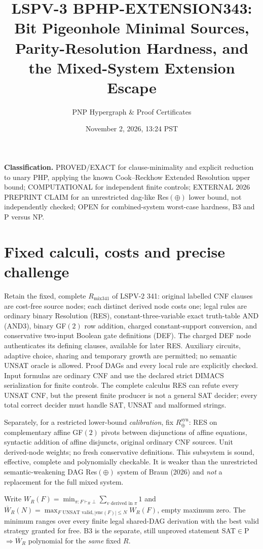 \documentclass[11pt]{article}
\title{LSPV-3 BPHP-EXTENSION343: Bit Pigeonhole Minimal Sources, Parity-Resolution Hardness, and the Mixed-System Extension Escape}
\author{PNP Hypergraph \& Proof Certificates}
\date{November 2, 2026, 13:24 PST}
\begin{document}
\maketitle
\noindent\textbf{Classification.} \textsc{PROVED/EXACT} for clause-minimality and explicit reduction to unary PHP, applying the known Cook--Reckhow Extended Resolution upper bound; \textsc{COMPUTATIONAL} for independent finite controls; \textsc{EXTERNAL 2026 PREPRINT CLAIM} for an unrestricted dag-like Res$(\oplus)$ lower bound, not independently checked; \textsc{OPEN} for combined-system worst-case hardness, B3 and P versus NP.

\section{Fixed calculi, costs and precise challenge}
Retain the fixed, complete $R_{\mathrm{mix341}}$ of LSPV-2 341: original labelled CNF clauses are cost-free source nodes; each distinct derived node costs one; legal rules are ordinary binary Resolution (RES), constant-three-variable exact truth-table AND (AND3), binary GF$(2)$ row addition, charged constant-support conversion, and conservative two-input Boolean gate definitions (DEF). The charged DEF node authenticates its defining clauses, available for later RES. Auxiliary circuits, adaptive choice, sharing and temporary growth are permitted; no semantic UNSAT oracle is allowed. Proof DAGs and every local rule are explicitly checked. Input formulas are ordinary CNF and use the declared strict DIMACS serialization for finite controls. The complete calculus RES can refute every UNSAT CNF, but the present finite producer is not a general SAT decider; every total correct decider must handle SAT, UNSAT and malformed strings.

Separately, for a restricted lower-bound \emph{calibration}, fix $R_{\oplus}^{\mathrm{syn}}$: RES on complementary affine GF$(2)$ pivots between disjunctions of affine equations, syntactic addition of affine disjuncts, original ordinary CNF sources. Unit derived-node weights; no fresh conservative definitions. This subsystem is sound, effective, complete and polynomially checkable. It is weaker than the unrestricted semantic-weakening DAG Res$(\oplus)$ system of Braun (2026) and \emph{not} a replacement for the full mixed system.

Write $W_R(F)=\min_{\pi:F\vdash_R\bot}\sum_{v\text{ derived in }\pi}1$ and $\overline W_R(N)=\max_{F\text{ UNSAT valid},|\mathrm{enc}(F)|\le N}W_R(F)$, empty maximum zero. The minimum ranges over every finite legal shared-DAG derivation with the best valid strategy granted for free. B3 is the separate, still unproved statement SAT$\in$P $\Rightarrow\overline W_R$ polynomial for the \emph{same} fixed $R$.
\end{document}
